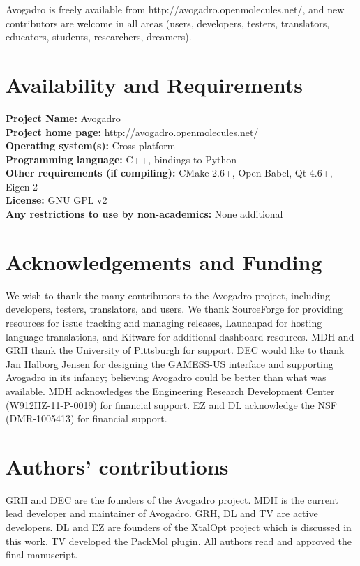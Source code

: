 \documentclass[10pt]{bmc_article}
\newenvironment{bmcformat}{\begin{raggedright}
  \baselineskip20pt\sloppy\setboolean{publ}{false}}{\end{raggedright}
  \baselineskip20pt\sloppy}
\begin{document}
\begin{bmcformat}
Avogadro is freely available from http://avogadro.openmolecules.net/,
and new contributors are welcome in all areas (users, developers,
testers, translators, educators, students, researchers, dreamers).

\section*{Availability and Requirements}

\textbf{Project Name:} Avogadro \\
\textbf{Project home page:} http://avogadro.openmolecules.net/ \\
\textbf{Operating system(s):} Cross-platform \\
\textbf{Programming language:} C++, bindings to Python \\
\textbf{Other requirements (if compiling):} CMake 2.6+, Open Babel, Qt 4.6+,
Eigen 2 \\
\textbf{License:} GNU GPL v2 \\
\textbf{Any restrictions to use by non-academics:} None additional

\section*{Acknowledgements and Funding}

We wish to thank the many contributors to the Avogadro project,
including developers, testers, translators, and users. We thank
SourceForge for providing resources for issue tracking and managing
releases, Launchpad for hosting language translations, and Kitware for
additional dashboard resources. MDH and GRH thank the University of
Pittsburgh for support. DEC would like to thank Jan Halborg Jensen for
designing the GAMESS-US interface and supporting Avogadro in its
infancy; believing Avogadro could be better than what was available.
MDH acknowledges the Engineering Research Development Center (W912HZ-11-P-0019)
for financial support. EZ and DL acknowledge the NSF (DMR-1005413) for financial
support.

\section*{Authors' contributions}
GRH and DEC are the founders of the Avogadro project. MDH is the
current lead developer and maintainer of Avogadro. GRH, DL and TV are
active developers. DL and EZ are founders of the XtalOpt project which
is discussed in this work. TV developed the PackMol plugin. All
authors read and approved the final manuscript.


\end{bmcformat}
\end{document}
